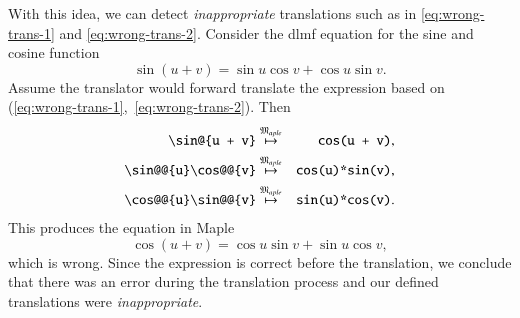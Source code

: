 \documentclass[a4paper,11pt]{article}
\newcommand{\Maple}{Maple}
\newcommand{\langMaple}{\mathfrak{M}_{aple}}
\theoremstyle{defTheoStyle}
\theoremstyle{defExampStyle}
\begin{document}
	With this idea, we can detect {\it inappropriate} translations such as in \eqref{eq:wrong-trans-1} and \eqref{eq:wrong-trans-2}. Consider the \gls*{dlmf} equation for the sine and cosine function~\parencite[(4.21.2)]{NIST:DLMF}
	\begin{equation}
	\sin \left(u+v\right) = \sin{u}\cos{v} + \cos{u}\sin{v}.
	\end{equation}
	Assume the translator would forward translate the expression based on (\ref{eq:wrong-trans-1},~\ref{eq:wrong-trans-2}). Then
	\begin{eqnarray}
	\verb|\sin@{u + v}| & \overset{\langMaple}{\mapsto} & \verb|cos(u + v)|,\\
	\verb|\sin@@{u}\cos@@{v}| & \overset{\langMaple}{\mapsto} & \verb|cos(u)*sin(v)|,\\
	\verb|\cos@@{u}\sin@@{v}| & \overset{\langMaple}{\mapsto} & \verb|sin(u)*cos(v)|.
	\end{eqnarray}
	This produces the equation in \Maple
	\begin{equation}
	\cos\left(u+v\right) = \cos{u}\sin{v} + \sin{u}\cos{v},
	\end{equation}
	which is wrong. Since the expression is correct before the translation, we conclude that there was an error 
	during the translation process and our defined translations were {\it inappropriate}.
	
\end{document}
